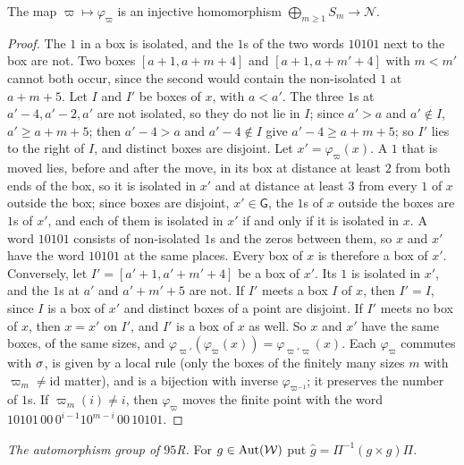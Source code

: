 \begin{lemma}\label{cl:lem:95box}
The map $\varpi\mapsto\varphi_\varpi$ is an injective homomorphism $\bigoplus_{m\ge1}S_m\to\mathcal N$.
\end{lemma}

\begin{proof}
The $1$ in a box is isolated, and the $1$s of the two words $10101$ next to the box are not. Two boxes $[a+1,a+m+4]$ and $[a+1,a+m'+4]$ with $m<m'$ cannot both occur, since the second would contain the non-isolated $1$ at $a+m+5$. Let $I$ and $I'$ be boxes of $x$, with $a<a'$. The three $1$s at $a'-4,a'-2,a'$ are not isolated, so they do not lie in $I$; since $a'>a$ and $a'\notin I$, $a'\ge a+m+5$; then $a'-4>a$ and $a'-4\notin I$ give $a'-4\ge a+m+5$; so $I'$ lies to the right of $I$, and distinct boxes are disjoint. Let $x'=\varphi_\varpi(x)$. A $1$ that is moved lies, before and after the move, in its box at distance at least $2$ from both ends of the box, so it is isolated in $x'$ and at distance at least $3$ from every $1$ of $x$ outside the box; since boxes are disjoint, $x'\in \mathsf G$, the $1$s of $x$ outside the boxes are $1$s of $x'$, and each of them is isolated in $x'$ if and only if it is isolated in $x$. A word $10101$ consists of non-isolated $1$s and the zeros between them, so $x$ and $x'$ have the word $10101$ at the same places. Every box of $x$ is therefore a box of $x'$. Conversely, let $I'=[a'+1,a'+m'+4]$ be a box of $x'$. Its $1$ is isolated in $x'$, and the $1$s at $a'$ and $a'+m'+5$ are not. If $I'$ meets a box $I$ of $x$, then $I'=I$, since $I$ is a box of $x'$ and distinct boxes of a point are disjoint. If $I'$ meets no box of $x$, then $x=x'$ on $I'$, and $I'$ is a box of $x$ as well. So $x$ and $x'$ have the same boxes, of the same sizes, and $\varphi_{\varpi'}(\varphi_\varpi(x))=\varphi_{\varpi'\varpi}(x)$. Each $\varphi_\varpi$ commutes with $\sigma$, is given by a local rule (only the boxes of the finitely many sizes $m$ with $\varpi_m\ne\mathrm{id}$ matter), and is a bijection with inverse $\varphi_{\varpi^{-1}}$; it preserves the number of $1$s. If $\varpi_m(i)\ne i$, then $\varphi_\varpi$ moves the finite point with the word $10101\,00\,0^{i-1}10^{m-i}\,00\,10101$.
\end{proof}

\emph{The automorphism group of $95$R.} For $g\in\operatorname{Aut}(\mathcal W)$ put $\hat g=\Pi^{-1}(g\times g)\Pi$.

